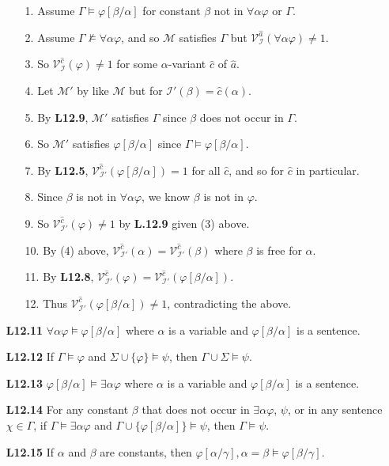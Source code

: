\documentclass[a4paper, 11pt]{article} %
\newcommand{\set}[1]{\lbrace#1\rbrace} %
\newcommand{\I}{\mathcal{I}}
\newcommand{\M}{\mathcal{M}}
\newcommand{\VV}[2]{\mathcal{V}_{#1}^{#2}} %
\newcommand{\va}[1]{\hat{#1}} %
\newcommand{\qt}[2]{#1 #2} %
\newcommand{\unisub}[2]{[#1/#2]}
\renewcommand{\models}{\vDash}
\newcommand{\nmodels}{\nvDash}
\def\metaA{\ensuremath{\varphi}}
\def\metaB{\ensuremath{\psi}}
\def\metaC{\ensuremath{\chi}}
\begin{document}
\begin{enumerate}[labelsep=.1in]
    \begin{itemize}
      \item[1.] Assume $\Gamma \models \metaA\unisub{\beta}{\alpha}$ for constant $\beta$ not in $\qt{\forall}{\alpha}\metaA$ or $\Gamma$.
      \item[2.] Assume $\Gamma \nmodels \qt{\forall}{\alpha}\metaA$, and so $\M$ satisfies $\Gamma$ but $\VV{\I}{\va{a}}(\qt{\forall}{\alpha}\metaA)\neq 1$.
      \item[3.] So $\VV{\I}{\va{c}}(\metaA)\neq 1$ for some $\alpha$-variant $\va{c}$ of $\va{a}$.
      \item[4.] Let $\M'$ by like $\M$ but for $\I'(\beta)=\va{c}(\alpha)$.
      \item[5.] By \textbf{L12.9}, $\M'$ satisfies $\Gamma$ since $\beta$ does not occur in $\Gamma$.
      \item[6.] So $\M'$ satisfies $\metaA\unisub{\beta}{\alpha}$ since $\Gamma \models \metaA\unisub{\beta}{\alpha}$.
      \item[7.] By \textbf{L12.5}, $\VV{\I'}{\va{c}}(\metaA\unisub{\beta}{\alpha})=1$ for all $\va{c}$, and so for $\va{c}$ in particular.
      \item[8.] Since $\beta$ is not in $\qt{\forall}{\alpha}\metaA$, we know $\beta$ is not in $\metaA$.
      \item[9.] So $\VV{\I'}{\va{c}}(\metaA)\neq 1$ by \textbf{L.12.9} given (3) above. 
      \item[10.] By (4) above, $\VV{\I'}{\va{c}}(\alpha)=\VV{\I'}{\va{c}}(\beta)$ where $\beta$ is free for $\alpha$. 
      \item[11.] By \textbf{L12.8}, $\VV{\I'}{\va{c}}(\metaA)=\VV{\I'}{\va{c}}(\metaA\unisub{\beta}{\alpha})$.
      \item[12.] Thus $\VV{\I'}{\va{c}}(\metaA\unisub{\beta}{\alpha})\neq 1$, contradicting the above.
    \end{itemize}
  \item[\bf L12.11] $\forall\alpha\metaA \models \metaA\unisub{\beta}{\alpha}$ where $\alpha$ is a variable and $\metaA\unisub{\beta}{\alpha}$ is a sentence.
  \item[\bf L12.12] If $\Gamma \models \metaA$ and $\Sigma \cup \set{\metaA} \models \metaB$, then $\Gamma\cup\Sigma \models \metaB$.
  \item[\bf L12.13] $\metaA\unisub{\beta}{\alpha} \models \exists\alpha\metaA$ where $\alpha$ is a variable and $\metaA\unisub{\beta}{\alpha}$ is a sentence.
  \item[\bf L12.14] For any constant $\beta$ that does not occur in $\exists\alpha\metaA$, $\metaB$, or in any sentence $\metaC\in\Gamma$, if $\Gamma \models \exists\alpha\metaA$ and $\Gamma \cup \set{\metaA\unisub{\beta}{\alpha}} \models \metaB$, then $\Gamma \models \metaB$.
  \item[\bf L12.15] If $\alpha$ and $\beta$ are constants, then $\metaA\unisub{\alpha}{\gamma}, \alpha = \beta \models \metaA\unisub{\beta}{\gamma}$.
\end{enumerate}
\end{document}
